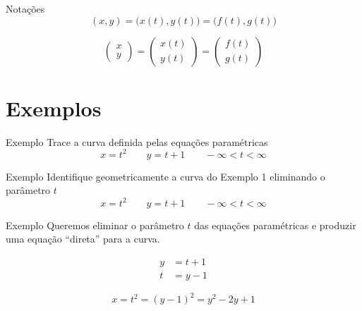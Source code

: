 \begin{frame}{Notações}
  \[
    (x, y)
    = \big(x(t), y(t)\big)
    = \big(f(t), g(t)\big)
  \]

  \pause
  \[
      \begin{pmatrix}  x    \\ y    \end{pmatrix}
    = \begin{pmatrix}  x(t) \\ y(t) \end{pmatrix}
    = \begin{pmatrix}  f(t) \\ g(t) \end{pmatrix}
  \]
\end{frame}

\section{Exemplos}

\addtocounter{exemplo}{1}
\begin{frame}{Exemplo \theexemplo}
  Trace a curva definida pelas equações paramétricas
  \[
    x = t^2        \qquad
    y = t + 1      \qquad
    -\infty < t < \infty
  \]
\end{frame}


\addtocounter{exemplo}{1}
\begin{frame}{Exemplo \theexemplo}
  Identifique geometricamente a curva do Exemplo 1 eliminando o parâmetro $t$
  \[
    x = t^2        \qquad
    y = t + 1      \qquad
    -\infty < t < \infty
  \]
\end{frame}

\begin{frame}{Exemplo \theexemplo}
  Queremos eliminar o parâmetro $t$ das equações paramétricas e produzir uma
  equação ``direta'' para a curva.

  \begin{align*}
    y & = t + 1 \\
    t & = y - 1
  \end{align*}

  \[
    x
    = t^2
    = (y - 1)^2
    = y^2 - 2y + 1
  \]
\end{frame}

